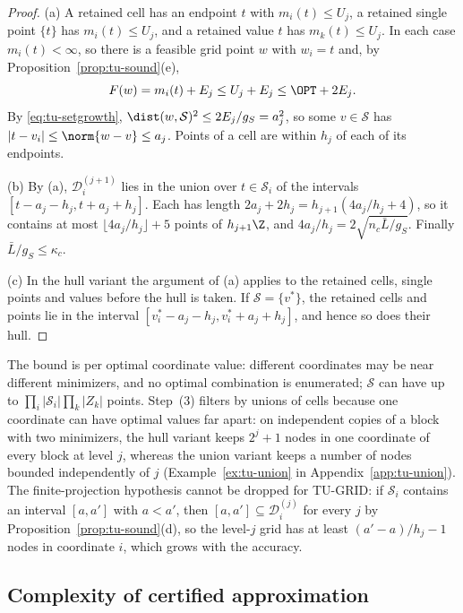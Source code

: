 \begin{proof}
(a) A retained cell has an endpoint $t$ with $m_i(t)\le U_j$, a retained
single point $\{t\}$ has $m_i(t)\le U_j$, and a retained value $t$ has
$m_k(t)\le U_j$. In each case $m_i(t)<\infty$, so there is a feasible grid
point $w$ with $w_i=t$ and, by Proposition~\ref{prop:tu-sound}(e),
\[
F(w)=m_i(t)+E_j\le U_j+E_j\le\OPT+2E_j .
\]
By \eqref{eq:tu-setgrowth}, $\dist(w,\mathcal S)^2\le2E_j/g_S=a_j^2$, so some
$v\in\mathcal S$ has $\lvert t-v_i\rvert\le\norm{w-v}\le a_j$. Points of a cell
are within $h_j$ of each of its endpoints.

(b) By (a), $\mathcal D^{(j+1)}_i$ lies in the union over $t\in\mathcal S_i$
of the intervals $[t-a_j-h_j,t+a_j+h_j]$. Each has length
$2a_j+2h_j=h_{j+1}(4a_j/h_j+4)$, so it contains at most
$\lfloor4a_j/h_j\rfloor+5$ points of $h_{j+1}\Z$, and
$4a_j/h_j=2\sqrt{n_c\bar L/g_S}$. Finally $\bar L/g_S\le\kappa_c$.

(c) In the hull variant the argument of (a) applies to the retained cells,
single points and values before the hull is taken. If $\mathcal S=\{v^*\}$,
the retained cells and points lie in the interval
$[v^*_i-a_j-h_j,v^*_i+a_j+h_j]$, and hence so does their hull.
\end{proof}

The bound is per optimal coordinate value: different coordinates may be
near different minimizers, and no optimal combination is enumerated;
$\mathcal S$ can have up to $\prod_i\lvert\mathcal S_i\rvert\prod_k\lvert Z_k\rvert$
points. Step~(3) filters by unions of cells because one coordinate can have
optimal values far apart: on independent copies of a block with two
minimizers, the hull variant keeps $2^j+1$ nodes in one coordinate of every
block at level $j$, whereas the union variant keeps a number of nodes
bounded independently of $j$ (Example~\ref{ex:tu-union} in
Appendix~\ref{app:tu-union}). The finite-projection hypothesis cannot be
dropped for TU-GRID: if $\mathcal S_i$ contains an interval $[a,a']$ with
$a<a'$, then $[a,a']\subseteq\mathcal D^{(j)}_i$ for every $j$ by
Proposition~\ref{prop:tu-sound}(d), so the level-$j$ grid has at least
$(a'-a)/h_j-1$ nodes in coordinate $i$, which grows with the accuracy.

\subsection{Complexity of certified approximation}\label{sec:tu-complexity}

